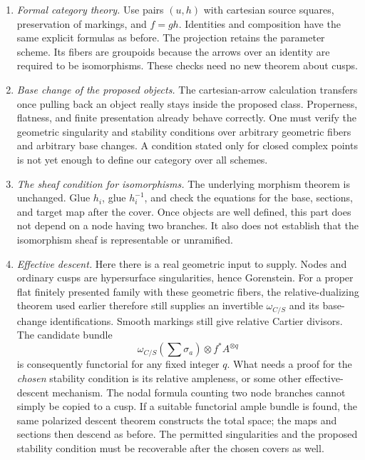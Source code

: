 \begin{enumerate}
\item \emph{Formal category theory.}
Use pairs $(u,h)$ with cartesian source squares, preservation of
markings, and $f=g h$. Identities and composition have the same
explicit formulas as before. The projection retains the parameter
scheme. Its fibers are groupoids because the arrows over an identity
are required to be isomorphisms. These checks need no new theorem
about cusps.

\item \emph{Base change of the proposed objects.}
The cartesian-arrow calculation transfers once pulling back an object
really stays inside the proposed class. Properness, flatness, and
finite presentation already behave correctly. One must verify the
geometric singularity and stability conditions over arbitrary
geometric fibers and arbitrary base changes. A condition stated
only for closed complex points is not yet enough to define our
category over all schemes.

\item \emph{The sheaf condition for isomorphisms.}
The underlying morphism theorem is unchanged. Glue $h_i$, glue
$h_i^{-1}$, and check the equations for the base, sections, and
target map after the cover. Once objects are well defined, this
part does not depend on a node having two branches. It also does
not establish that the isomorphism sheaf is representable or
unramified.

\item \emph{Effective descent.}
Here there is a real geometric input to supply. Nodes and ordinary
cusps are hypersurface singularities, hence Gorenstein. For a proper
flat finitely presented family with these geometric fibers, the
relative-dualizing theorem used earlier therefore still supplies an
invertible $\omega_{C/S}$ and its base-change identifications.
Smooth markings still give relative Cartier divisors. The
candidate bundle
\[
       \omega_{C/S}(\textstyle\sum\sigma_a)\otimes f^*A^{\otimes q}
\]
is consequently functorial for any fixed integer $q$.
What needs a proof for the \emph{chosen} stability condition is its
relative ampleness, or some other effective-descent mechanism.
The nodal formula counting two node branches cannot simply be
copied to a cusp. If a suitable functorial ample bundle is found,
the same polarized descent theorem constructs the total space;
the maps and sections then descend as before. The permitted
singularities and the proposed stability condition must be
recoverable after the chosen covers as well.


\end{enumerate}
